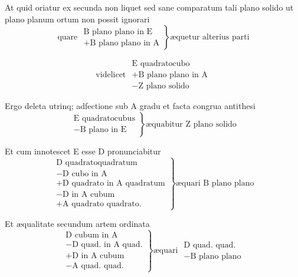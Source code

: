 \documentclass[11pt,a4paper]{article}
\begin{document}
At quid oriatur ex secunda non liquet sed sane comparatum tali plano solido ut plano planum ortum non possit ignorari
\[ \text{quare } \left.\begin{array}{l} \text{B plano plano in E} \\ +\text{B plano plano in A} \end{array}\right\} \text{æquetur alterius parti} \]

\[ \text{videlicet } \begin{array}{l} \text{E quadratocubo} \\ +\text{B plano plano in A} \\ -\text{Z plano solido} \end{array} \]

Ergo deleta utrinq; adfectione sub A gradu et facta congrua antithesi
\[ \left.\begin{array}{l} \text{E quadratocubus} \\ -\text{B plano in E} \end{array}\right\} \text{æquabitur Z plano solido} \]

Et cum innotescet E esse D pronunciabitur
\[ \left.\begin{array}{l} \text{D quadratoquadratum} \\ -\text{D cubo in A} \\ +\text{D quadrato in A quadratum} \\ -\text{D in A cubum} \\ +\text{A quadrato quadrato.} \end{array}\right\} \text{æquari B plano plano} \]

Et æqualitate secundum artem ordinata
\[ \left.\begin{array}{l} \text{D cubum in A} \\ -\text{D quad. in A quad.} \\ +\text{D in A cubum} \\ -\text{A quad. quad.} \end{array}\right\} \text{æquari } \begin{array}{l} \text{D quad. quad.} \\ -\text{B plano plano} \end{array} \]
\end{document}
